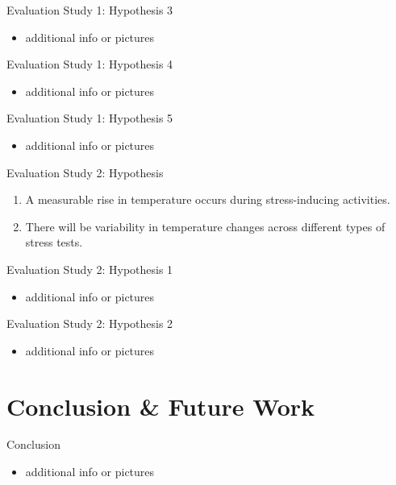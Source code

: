 \documentclass[en]{sdqbeamer}
\begin{document}
\begin{frame}{Evaluation Study 1: Hypothesis 3}
    \begin{itemize}
        \item additional info or pictures
    \end{itemize}
\end{frame}

\begin{frame}{Evaluation Study 1: Hypothesis 4}
    \begin{itemize}
        \item additional info or pictures
    \end{itemize}
\end{frame}

\begin{frame}{Evaluation Study 1: Hypothesis 5}
    \begin{itemize}
        \item additional info or pictures
    \end{itemize}
\end{frame}

\begin{frame}{Evaluation Study 2: Hypothesis}
    \begin{enumerate}[label=H\arabic{*}:]
      \item A measurable rise in temperature occurs during stress-inducing activities.
      \item There will be variability in temperature changes across different types of stress tests.
    \end{enumerate}
\end{frame}

\begin{frame}{Evaluation Study 2: Hypothesis 1}
    \begin{itemize}
        \item additional info or pictures
    \end{itemize}
\end{frame}

\begin{frame}{Evaluation Study 2: Hypothesis 2}
    \begin{itemize}
        \item additional info or pictures
    \end{itemize}
\end{frame}

\section{Conclusion \& Future Work}
\begin{frame}{Conclusion}
    \begin{itemize}
        \item additional info or pictures
    \end{itemize}
\end{frame}
\end{document}
